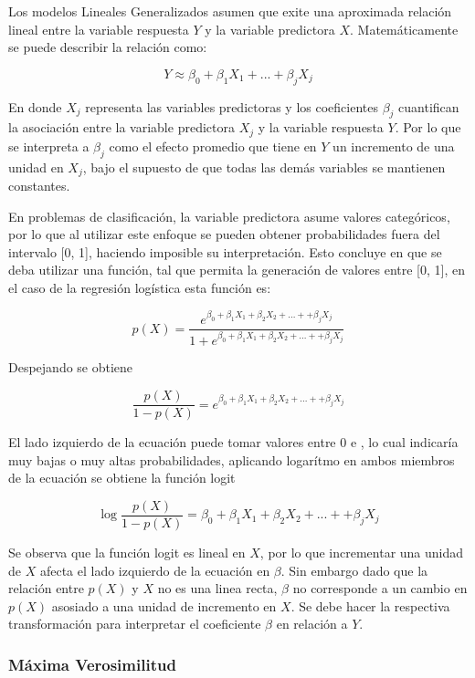 \documentclass[a4paper,12pt]{Latex/Classes/PhDthesisPSnPDF}
\begin{document}
Los modelos Lineales Generalizados asumen que exite una aproximada relación lineal entre la variable respuesta $Y$ y la variable predictora $X$. Matemáticamente se puede describir la relación como:

$$ Y \approx \beta_{0} + \beta_{1}X_{1} + ... + \beta_{j}X_{j} $$

En donde $X_{j}$ representa las variables predictoras y los coeficientes $\beta_{j}$ cuantifican la asociación entre la variable predictora $X_{j}$ y la variable respuesta $Y$. Por lo que se interpreta a $\beta_{j}$ como el efecto promedio que tiene en $Y$ un incremento de una unidad en $X_{j}$, bajo el supuesto de que todas las demás variables se mantienen constantes.

En problemas de clasificación, la variable predictora asume valores categóricos, por lo que al utilizar este enfoque se pueden obtener probabilidades fuera del intervalo [0, 1], haciendo imposible su interpretación. Esto concluye en que se deba utilizar una función, tal que permita la generación de valores entre [0, 1], en el caso de la regresión logística esta función es:

$$
p(X) = \frac{e^{\beta_{0} + \beta_{1}X_{1} + \beta_{2}X_{2} + ... + + \beta_{j}X_{j} }}{1 + e^{\beta_{0} + \beta_{1}X_{1} + \beta_{2}X_{2} + ... + + \beta_{j}X_{j} }}
$$

Despejando se obtiene

$$ \frac{p(X)}{1 - p(X)} = e^{\beta_{0} + \beta_{1}X_{1} + \beta_{2}X_{2} + ... + + \beta_{j}X_{j} } $$

El lado izquierdo de la ecuación puede tomar valores entre 0 e \infinity, lo cual indicaría muy bajas o muy altas probabilidades, aplicando logarítmo en ambos miembros de la ecuación se obtiene la función logit

$$ \log{\frac{p(X)}{1 - p(X)}} = \beta_{0} + \beta_{1}X_{1} + \beta_{2}X_{2} + ... + + \beta_{j}X_{j}  $$

Se observa que la función logit es lineal en $X$, por lo que incrementar una unidad de $X$ afecta el lado izquierdo de la ecuación en $\beta$. Sin embargo dado que la relación entre $p(X)$ y $X$ no es una linea recta, $\beta$ no corresponde a un cambio en $p(X)$ asosiado a una unidad de incremento en $X$. Se debe hacer la respectiva transformación para interpretar el coeficiente $\beta$ en relación a $Y$.

\subsubsection{Máxima Verosimilitud}
\end{document}
